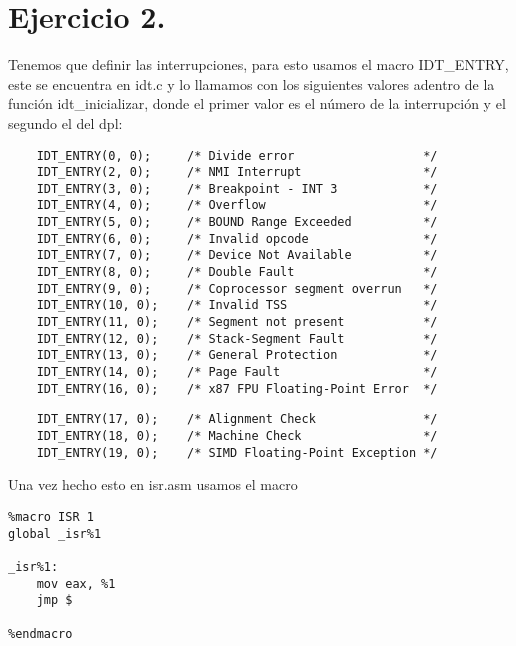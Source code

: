 \section{Ejercicio 2.}

\noindent Tenemos que definir las interrupciones, para esto usamos el macro IDT\_ENTRY, este se encuentra en idt.c y lo llamamos con los siguientes valores adentro de la función idt\_inicializar, donde el primer valor es el número de la interrupción y el segundo el del dpl:

\begin{codesnippet}
\begin{verbatim}
    IDT_ENTRY(0, 0);     /* Divide error                  */
    IDT_ENTRY(2, 0);     /* NMI Interrupt                 */
    IDT_ENTRY(3, 0);     /* Breakpoint - INT 3            */
    IDT_ENTRY(4, 0);     /* Overflow                      */
    IDT_ENTRY(5, 0);     /* BOUND Range Exceeded          */
    IDT_ENTRY(6, 0);     /* Invalid opcode                */
    IDT_ENTRY(7, 0);     /* Device Not Available          */
    IDT_ENTRY(8, 0);     /* Double Fault                  */
    IDT_ENTRY(9, 0);     /* Coprocessor segment overrun   */
    IDT_ENTRY(10, 0);    /* Invalid TSS                   */
    IDT_ENTRY(11, 0);    /* Segment not present           */
    IDT_ENTRY(12, 0);    /* Stack-Segment Fault           */
    IDT_ENTRY(13, 0);    /* General Protection            */
    IDT_ENTRY(14, 0);    /* Page Fault                    */
    IDT_ENTRY(16, 0);    /* x87 FPU Floating-Point Error  */
    \end{verbatim}
\end{codesnippet}

\begin{codesnippet}
\begin{verbatim}
    IDT_ENTRY(17, 0);    /* Alignment Check               */
    IDT_ENTRY(18, 0);    /* Machine Check                 */
    IDT_ENTRY(19, 0);    /* SIMD Floating-Point Exception */
\end{verbatim}
\end{codesnippet}

\noindent Una vez hecho esto en isr.asm usamos el macro 

\begin{codesnippet}
\begin{verbatim}
%macro ISR 1
global _isr%1

_isr%1:
    mov eax, %1
    jmp $

%endmacro
\end{verbatim}
\end{codesnippet}

